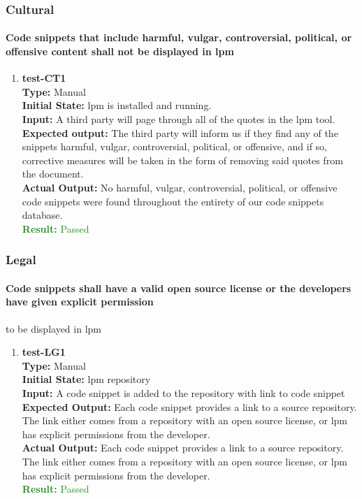 \documentclass[12pt, titlepage]{article}
\begin{document}
\subsubsection{Cultural}
\paragraph{Code snippets that include harmful, vulgar, controversial, political, or offensive
content shall not be displayed in lpm}
\begin{enumerate}
    \item{\textbf{test-CT1}\\}
    \textbf{Type:} Manual\\
    \textbf{Initial State:} lpm is installed and running.\\
    \textbf{Input:} A third party will page through all of the quotes in the lpm tool.\\
    \textbf{Expected output:} The third party will inform us if they find any of the snippets harmful, vulgar, controversial, political, or offensive, and if so, corrective measures will be taken in the form of removing said quotes from the document. \\
    \textbf{Actual Output:}  No harmful, vulgar, controversial, political, or offensive code snippets were found throughout the entirety of our code snippets database. \\
    \textcolor{ForestGreen}{\textbf{Result:} Passed}
\end{enumerate}

\subsubsection{Legal}
\paragraph{Code snippets shall have a valid open source license or the developers have given explicit permission} to be displayed in lpm
\begin{enumerate}
    \item{\textbf{test-LG1}\\}
    \textbf{Type:} Manual\\
    \textbf{Initial State:} lpm repository \\
    \textbf{Input:} A code snippet is added to the repository with link to code snippet \\
    \textbf{Expected Output:} Each code snippet provides a link to a source repository. The link either comes from a repository with an open source license, or lpm has explicit permissions from the developer.\\
    \textbf{Actual Output:} Each code snippet provides a link to a source repository. The link either comes from a repository with an open source license, or lpm has explicit permissions from the developer.\\
    \textcolor{ForestGreen}{\textbf{Result:} Passed}
\end{enumerate}
\end{document}
